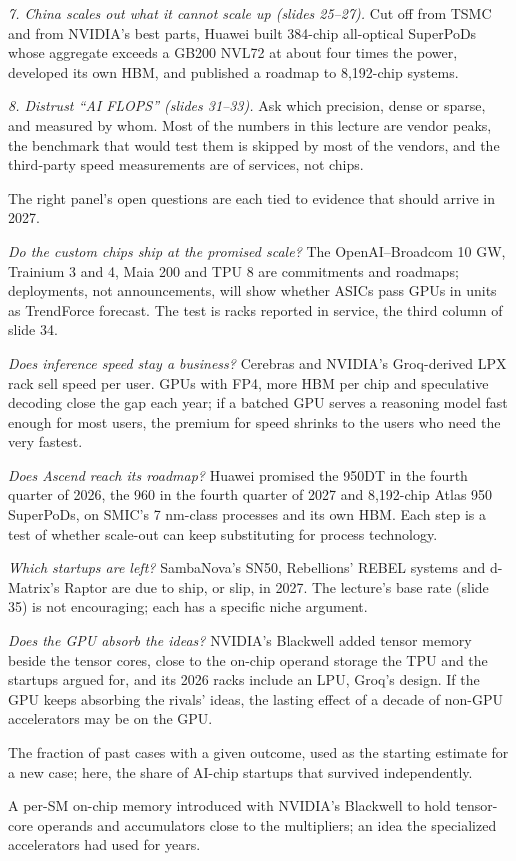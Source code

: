 \documentclass[11pt,letterpaper]{article}
\newenvironment{terms}{\begin{tcolorbox}[termsbox]\begin{description}[leftmargin=1.1em,itemsep=3pt,topsep=2pt,font=\normalfont]}{\end{description}\end{tcolorbox}}
\newcommand{\term}[2]{\item[\textbf{#1}]\index{#1} #2}
\begin{document}
\emph{7. China scales out what it cannot scale up (slides 25--27).} Cut off from TSMC and from NVIDIA's best parts, Huawei built 384-chip all-optical SuperPoDs whose aggregate exceeds a GB200 NVL72 at about four times the power, developed its own HBM, and published a roadmap to 8{,}192-chip systems.

\emph{8. Distrust ``AI FLOPS'' (slides 31--33).} Ask which precision, dense or sparse, and measured by whom. Most of the numbers in this lecture are vendor peaks, the benchmark that would test them is skipped by most of the vendors, and the third-party speed measurements are of services, not chips.

The right panel's open questions are each tied to evidence that should arrive in 2027.

\emph{Do the custom chips ship at the promised scale?} The OpenAI--Broadcom 10 GW, Trainium 3 and 4, Maia 200 and TPU 8 are commitments and roadmaps; deployments, not announcements, will show whether ASICs pass GPUs in units as TrendForce forecast. The test is racks reported in service, the third column of slide 34.

\emph{Does inference speed stay a business?} Cerebras and NVIDIA's Groq-derived LPX rack sell speed per user. GPUs with FP4, more HBM per chip and speculative decoding close the gap each year; if a batched GPU serves a reasoning model fast enough for most users, the premium for speed shrinks to the users who need the very fastest.

\emph{Does Ascend reach its roadmap?} Huawei promised the 950DT in the fourth quarter of 2026, the 960 in the fourth quarter of 2027 and 8{,}192-chip Atlas 950 SuperPoDs, on SMIC's 7 nm-class processes and its own HBM. Each step is a test of whether scale-out can keep substituting for process technology.

\emph{Which startups are left?} SambaNova's SN50, Rebellions' REBEL systems and d-Matrix's Raptor are due to ship, or slip, in 2027. The lecture's base rate (slide 35) is not encouraging; each has a specific niche argument.

\emph{Does the GPU absorb the ideas?} NVIDIA's Blackwell added tensor memory beside the tensor cores, close to the on-chip operand storage the TPU and the startups argued for, and its 2026 racks include an LPU, Groq's design. If the GPU keeps absorbing the rivals' ideas, the lasting effect of a decade of non-GPU accelerators may be on the GPU.

\begin{terms}
\term{base rate}{The fraction of past cases with a given outcome, used as the starting estimate for a new case; here, the share of AI-chip startups that survived independently.}
\term{tensor memory}{A per-SM on-chip memory introduced with NVIDIA's Blackwell to hold tensor-core operands and accumulators close to the multipliers; an idea the specialized accelerators had used for years.}
\end{terms}
\end{document}
